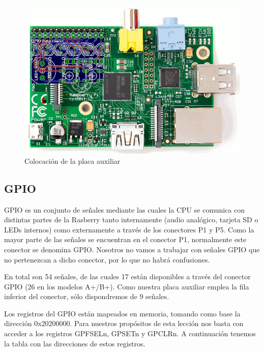 \begin{figure}[h]
  \centering
    \includegraphics[width=14cm]{graphs/posicionaux.png}
  \caption{Colocación de la placa auxiliar}
  \label{fig:posicionaux}
\end{figure}


\subsection{GPIO}

GPIO es un conjunto de señales mediante las cuales la CPU se comunica con distintas partes
de la Rasberry tanto internamente (audio analógico, tarjeta SD o LEDs internos) como
externamente a través de los conectores P1 y P5. Como la mayor parte de las señales se
encuentran en el conector P1, normalmente este conector se denomina GPIO. Nosotros
no vamos a trabajar con señales GPIO que no pertenezcan a dicho conector, por lo que no
habrá confusiones.

En total son 54 señales, de las cuales 17 están disponibles a través del conector
GPIO (26 en los modelos A+/B+). Como nuestra placa auxiliar emplea la fila inferior
del conector, sólo dispondremos de 9 señales.

Los registros del GPIO están mapeados en memoria, tomando como base la dirección 0x20200000.
Para nuestros propósitos de esta lección nos basta con acceder a los registros GPFSELn,
GPSETn y GPCLRn. A continuación tenemos la tabla con las direcciones de estos registros.

